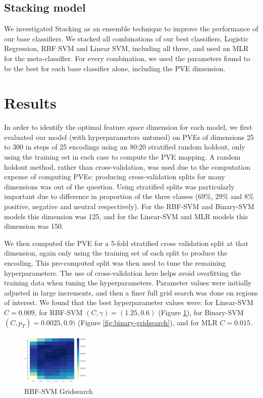 \documentclass[11pt]{article}
\begin{document}
\subsection{Stacking model}
We investigated Stacking as an ensemble technique to improve the performance of our base classifiers. We stacked all combinations of our best classifiers, Logistic Regression, RBF SVM and Linear SVM, including all three, and used an MLR for the meta-classifier. For every combination, we used the parameters found to be the best for each base classifier alone, including the PVE dimension.

\section{Results}
In order to identify the optimal feature space dimension for each model, we first evaluated our model (with hyperparameters untuned) on PVEs of dimensions 25 to 300 in steps of 25 encodings using an 80:20 stratified random holdout, only using the training set in each case to compute the PVE mapping. A random holdout method, rather than cross-validation, was used due to the computation expense of computing PVEs: producing cross-validation splits for many dimensions was out of the question. Using stratified splits was particularly important due to difference in proportion of the three classes (69\%, 29\% and 8\% positive, negative and neutral respectively). For the RBF-SVM and Binary-SVM models this dimension was 125, and for the Linear-SVM and MLR models this dimension was 150.

We then computed the PVE for a 5-fold stratified cross validation split at that dimension, again only using the training set of each split to produce the encoding. This pre-computed split was then used to tune the remaining hyperparameters. The use of cross-validation here helps avoid overfitting the training data when tuning the hyperparameters. Parameter values were initially adjusted in large increments, and then a finer full grid search was done on regions of interest. We found that the best hyperparameter values were: for Linear-SVM $C = 0.009$, for RBF-SVM $(C, \gamma) = (1.25, 0.6)$ (Figure \ref{fig:rbf-gridsearch}), for Binary-SVM $(C, p_T) = 0.0025, 0.9)$ (Figure \ref{fig:binary-gridsearch}), and for MLR $C = 0.015$.
\begin{figure}
	\centering
	\includegraphics[width = 0.3\textwidth]{fig-rbf-gridsearch.png}
	\caption{RBF-SVM Gridsearch}
	\label{fig:rbf-gridsearch}
\end{figure}
\end{document}

